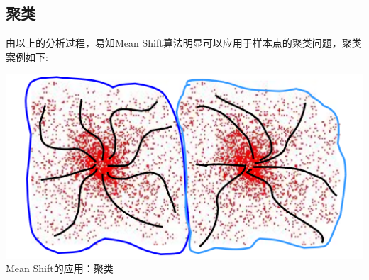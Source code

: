 \documentclass{article}
\begin{document}
\subsection{聚类}
由以上的分析过程，易知Mean Shift算法明显可以应用于样本点的聚类问题，聚类案例如下:
\begin{center}
    \includegraphics[width=\textwidth]{Images/cluster1.png}
    Mean Shift的应用：聚类
\end{center}
\end{document}
